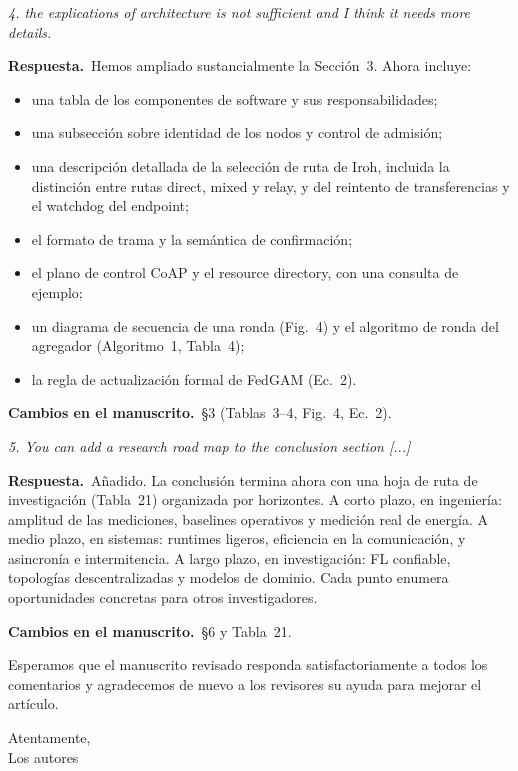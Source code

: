 \documentclass[11pt,a4paper]{article}
\newenvironment{comment}{\par\medskip\noindent\begin{minipage}{\linewidth}\color{blue!45!black}\itshape}{\end{minipage}\par}
\newcommand{\reply}{\par\smallskip\noindent\textbf{Respuesta.}~}
\newcommand{\changes}{\par\smallskip\noindent\textbf{Cambios en el manuscrito.}~}
\begin{document}
\begin{comment}
4. the explications of architecture is not sufficient and I think it needs more details.
\end{comment}
\reply Hemos ampliado sustancialmente la Sección~3. Ahora incluye:
\begin{itemize}[leftmargin=1.3em,itemsep=0.1em]
\item una tabla de los componentes de software y sus responsabilidades;
\item una subsección sobre identidad de los nodos y control de admisión;
\item una descripción detallada de la selección de ruta de Iroh, incluida la distinción entre rutas direct, mixed y relay, y del reintento de transferencias y el watchdog del endpoint;
\item el formato de trama y la semántica de confirmación;
\item el plano de control CoAP y el resource directory, con una consulta de ejemplo;
\item un diagrama de secuencia de una ronda (Fig.~4) y el algoritmo de ronda del agregador (Algoritmo~1, Tabla~4);
\item la regla de actualización formal de FedGAM (Ec.~2).
\end{itemize}

\changes \S3 (Tablas~3--4, Fig.~4, Ec.~2).

\begin{comment}
5. You can add a research road map to the conclusion section [...]
\end{comment}
\reply Añadido. La conclusión termina ahora con una hoja de ruta de investigación (Tabla~21) organizada por horizontes. A corto plazo, en ingeniería: amplitud de las mediciones, baselines operativos y medición real de energía. A medio plazo, en sistemas: runtimes ligeros, eficiencia en la comunicación, y asincronía e intermitencia. A largo plazo, en investigación: FL confiable, topologías descentralizadas y modelos de dominio. Cada punto enumera oportunidades concretas para otros investigadores.

\changes \S6 y Tabla~21.

\bigskip
Esperamos que el manuscrito revisado responda satisfactoriamente a todos los comentarios y agradecemos de nuevo a los revisores su ayuda para mejorar el artículo.

Atentamente,\\
Los autores
\end{document}
